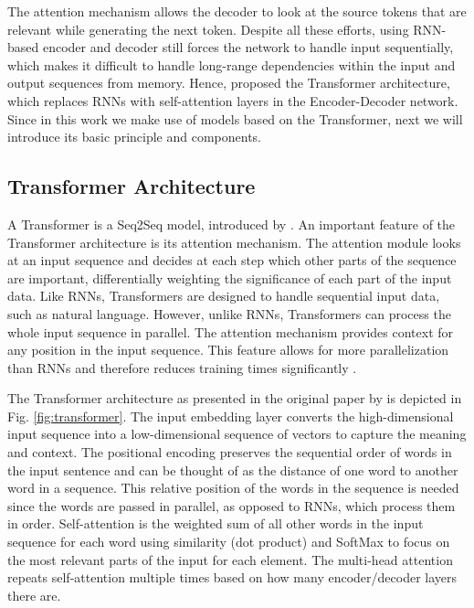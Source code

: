 The attention mechanism allows the decoder to look at the source tokens that are relevant while generating the next token. Despite all these efforts, using RNN-based encoder and decoder still forces the network to handle input sequentially, which makes it difficult to handle long-range dependencies within the input and output sequences from memory. Hence, \cite{transformer} proposed the Transformer architecture, which replaces RNNs with self-attention layers in the Encoder-Decoder network. Since in this work we make use of models based on the Transformer, next we will introduce its basic principle and components.

\subsection{Transformer Architecture}
\label{sec:Background:Transformer}
A Transformer is a Seq2Seq model, introduced by \citet{transformer}. An important feature of the Transformer architecture is its attention mechanism. The attention module looks at an input sequence and decides at each step which other parts of the sequence are important, differentially weighting the significance of each part of the input data. Like RNNs, Transformers are designed to handle sequential input data, such as natural language. However, unlike RNNs, Transformers can process the whole input sequence in parallel. The attention mechanism provides context for any position in the input sequence. This feature allows for more parallelization than RNNs and therefore reduces training times significantly \parencite{transformer}.

The Transformer architecture as presented in the original paper by \citet{transformer} is depicted in Fig. \ref{fig:transformer}.
The input embedding layer converts the high-dimensional input sequence into a low-dimensional sequence of vectors to capture the meaning and context.
The positional encoding preserves the sequential order of words in the input sentence and can be thought of as the distance of one word to another word in a sequence. This relative position of the words in the sequence is needed since the words are passed in parallel, as opposed to RNNs, which process them in order.
Self-attention is the weighted sum of all other words in the input sequence for each word using similarity (dot product) and SoftMax to focus on the most relevant parts of the input for each element. The multi-head attention repeats self-attention multiple times based on how many encoder/decoder layers there are.


